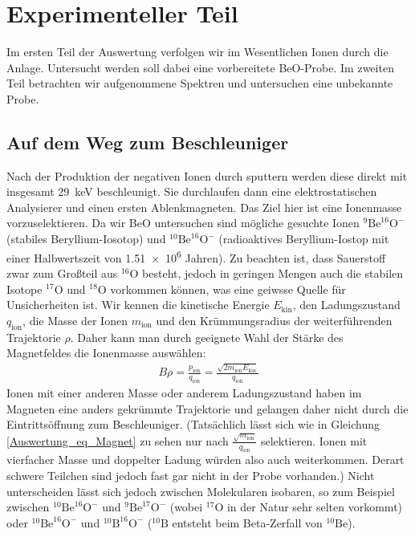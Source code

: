 \section{Experimenteller Teil}
Im ersten Teil der Auswertung verfolgen wir im Wesentlichen Ionen durch die Anlage.
Untersucht werden soll dabei eine vorbereitete BeO-Probe.
Im zweiten Teil betrachten wir aufgenommene Spektren und untersuchen eine unbekannte Probe.

\subsection{Auf dem Weg zum Beschleuniger}
Nach der Produktion der negativen Ionen durch sputtern werden diese direkt mit insgesamt \SI{29}{\kilo\electronvolt} beschleunigt.
Sie durchlaufen dann eine elektrostatischen Analysierer und einen ersten Ablenkmagneten.
Das Ziel hier ist eine Ionenmasse vorzuselektieren.
Da wir BeO untersuchen sind mögliche gesuchte Ionen $^{9}\text{Be}^{16}\text{O}^{-}$ (stabiles Beryllium-Iosotop) und $^{10}\text{Be}^{16}\text{O}^{-}$ (radioaktives Beryllium-Iostop mit einer Halbwertszeit von \num{1.51e6} Jahren).
Zu beachten ist, dass Sauerstoff zwar zum Großteil aus $^{16}$O besteht, jedoch in geringen Mengen auch die stabilen Isotope $^{17}$O und $^{18}$O vorkommen können, was eine geiwsse Quelle für Unsicherheiten ist.
Wir kennen die kinetische Energie $E_{\text{kin}}$, den Ladungszustand $q_{\text{ion}}$, die Masse der Ionen $m_{\text{ion}}$ und den Krümmungsradius der weiterführenden Trajektorie $\rho$.
Daher kann man durch geeignete Wahl der Stärke des Magnetfeldes die Ionenmasse auswählen:
\begin{gather}
    B \rho = \frac{p_{\text{ion}}}{q_{\text{ion}}} = \frac{\sqrt{2m_{\text{ion}}E_{\text{kin}}}}{q_{\text{ion}}}
    \label{Auswertung_eq_Magnet}
\end{gather}
Ionen mit einer anderen Masse oder anderem Ladungszustand haben im Magneten eine anders gekrümmte Trajektorie und gelangen daher nicht durch die Eintrittsöffnung zum Beschleuniger.
(Tatsächlich lässt sich wie in Gleichung \ref{Auswertung_eq_Magnet} zu sehen nur nach $\frac{\sqrt{m_{\text{ion}}}}{q_{\text{ion}}}$ selektieren.
Ionen mit vierfacher Masse und doppelter Ladung würden also auch weiterkommen. Derart schwere Teilchen sind jedoch fast gar nicht in der Probe vorhanden.)
Nicht unterscheiden lässt sich jedoch zwischen Molekularen isobaren, so zum Beispiel zwischen $^{10}\text{Be}^{16}\text{O}^{-}$ und $^{9}\text{Be}^{17}\text{O}^{-}$ (wobei $^{17}\text{O}$ in der Natur sehr selten vorkommt) oder $^{10}\text{Be}^{16}\text{O}^{-}$ und $^{10}\text{B}^{16}\text{O}^{-}$ ($^{10}\text{B}$ entsteht beim Beta-Zerfall von $^{10}\text{Be}$).

